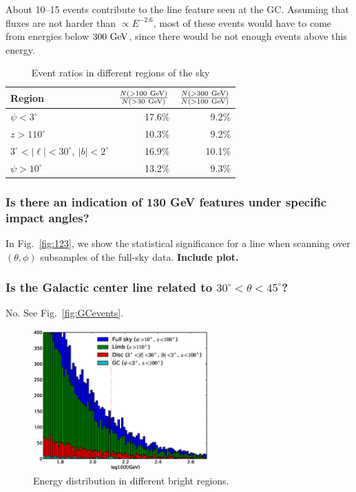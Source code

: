 \documentclass[aps,twocolumn,prd,superscriptaddress,showpacs,nofootinbib,fixfloat]{revtex4}
\newcommand{\GeV}{{\rm ~GeV}}
\begin{document}
About 10--15 events contribute to the line feature seen at the GC. Assuming
that fluxes are not harder than $\propto E^{-2.6}$, most of these events would
have to come from energies below $300\GeV$, since there would be not enough
events above this energy.

\begin{table}
  \begin{tabular}{lrr}
    \hline
    Region & $\frac{N(>100\GeV)}{N(>30\GeV)}$ & $\frac{N(>300\GeV)}{N(>100\GeV)}$\\
    \hline
    $\psi<3^\circ$ & 17.6\% & 9.2\% \\
    $z>110^\circ$  & 10.3\% & 9.2\% \\
    $3^\circ < |\ell| < 30^\circ,\ |b|<2^\circ$ & 16.9\% & 10.1\% \\
    $\psi>10^\circ$ & 13.2\% & 9.3\% \\
    \hline
  \end{tabular}
  \caption{Event ratios in different regions of the sky}
  \label{tab:eventRatios}
\end{table}

\subsubsection{Is there an indication of 130 GeV features under specific impact
angles?} In Fig.~\ref{fig:123}, we show the statistical significance for a
line when scanning over $(\theta, \phi)$ subsamples of the full-sky data.
\textbf{Include plot.}

\subsubsection{Is the Galactic center line related to
$30^\circ<\theta<45^\circ$?}
No. See Fig.~\ref{fig:GCevents}.


\begin{figure}
\centering
\includegraphics[width=0.6\textwidth]{plots/target_spectra.eps}
\caption{Energy distribution in different bright regions.}
\label{fig:target_spectra}
\end{figure}
\end{document}
